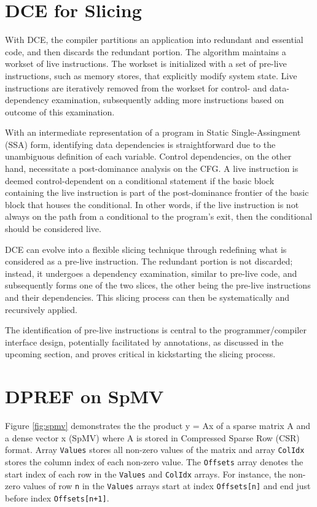 \documentclass{acaces}
\begin{document}
\section{DCE for Slicing}

With DCE, the compiler partitions an application into redundant and essential code, and then discards the redundant portion.
The algorithm maintains a workset of live instructions.
The workset is initialized with a set of pre-live instructions, such as memory stores, that explicitly modify system state.
Live instructions are iteratively removed from the workset for control- and data-dependency examination,
subsequently adding more instructions based on outcome of this examination.

With an intermediate representation of a program in Static Single-Assingment (SSA) form,
identifying data dependencies is straightforward due to the unambiguous definition of each variable.
Control dependencies, on the other hand, necessitate a post-dominance analysis on the CFG.
A live instruction is deemed control-dependent on a conditional statement
if the basic block containing the live instruction is part of the post-dominance frontier of the basic block that houses the conditional.
In other words, if the live instruction is not always on the path from a conditional to the program's exit, then the conditional should be considered live.

DCE can evolve into a flexible slicing technique through redefining what is considered as a pre-live instruction.
The redundant portion is not discarded; instead, it undergoes a dependency examination, similar to pre-live code, and subsequently forms one of the two slices, the other being the pre-live instructions and their dependencies.
This slicing process can then be systematically and recursively applied.

The identification of pre-live instructions is central to the programmer/compiler interface design,
potentially facilitated by annotations, as discussed in the upcoming section,
and proves critical in kickstarting the slicing process.

\section{DPREF on SpMV}

Figure \ref{fig:spmv} demonstrates the the product y = Ax of a sparse matrix A and a dense vector x (SpMV) where A is stored in Compressed Sparse Row (CSR) format.
Array \texttt{Values} stores all non-zero values of the matrix and array \texttt{ColIdx} stores the column index of each non-zero value.
The \texttt{Offsets} array denotes the start index of each row in the \texttt{Values} and \texttt{ColIdx} arrays.
For instance, the non-zero values of row \texttt{n} in the \texttt{Values} arrays start at index \texttt{Offsets[n]}
and end just before index \texttt{Offsets[n+1]}.
\end{document}
